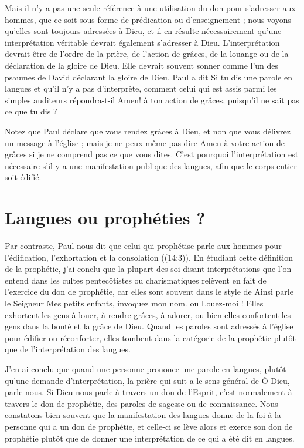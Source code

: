 Mais il n'y a pas une seule référence à une utilisation du don
 pour s'adresser aux hommes, que ce soit sous forme de prédication
 ou d'enseignement ; nous voyons qu'elles sont toujours adressées à Dieu,
 et il en résulte nécessairement qu'une interprétation véritable devrait
 également s'adresser à Dieu. L'interprétation devrait être de l'ordre
 de la prière, de l'action de grâces, de la louange ou de la déclaration
 de la gloire de Dieu. Elle devrait souvent sonner comme l'un des psaumes
 de David déclarant la gloire de Dieu. Paul a dit\frcolon{}
 \Og Si tu dis une parole en langues et qu'il n'y a pas d'interprète,
 comment celui qui est assis parmi les simples auditeurs
 répondra-t-il\frcolon{} Amen! à ton action de grâces, puisqu'il ne sait pas
 ce que tu dis ? \Fg{}

Notez que Paul déclare que vous rendez grâces à Dieu, et non que vous délivrez
 un message à l'église ; mais je ne peux même pas dire \Og Amen \Fg{}
 à votre action de grâces si je ne comprend pas ce que vous dites.
 C'est pourquoi l'interprétation est nécessaire s'il y a une manifestation
 publique des langues, afin que le corps entier soit édifié.


\section{Langues ou proph\'eties ?}

Par contraste, Paul nous dit que celui qui prophétise
 parle aux hommes pour l'édification, l'exhortation et la consolation
 ((14:3)). En étudiant cette définition
 de la prophétie, j'ai conclu que la plupart des soi-disant
 interprétations que l'on entend dans les cultes pentecôtistes
 ou charismatiques relèvent en fait de l'exercice du don de prophétie,
 car elles sont souvent dans le style de\frcolon{} \Og Ainsi parle le Seigneur\frcolon{}
 \Og Mes petits enfants, invoquez mon nom. \Fg{} ou \Og Louez-moi ! \Fg{}
 Elles exhortent les gens à louer, à rendre grâces, à adorer,
 ou bien elles confortent les gens dans la bonté et la grâce de Dieu.
 Quand les paroles sont adressés à l'église pour édifier ou réconforter, elles tombent
 dans la catégorie de la prophétie plutôt que de l'interprétation des langues.

J'en ai conclu que quand une personne prononce une parole en langues,
 plutôt qu'une demande d'interprétation, la prière qui suit
 a le sens général de\frcolon{} \Og Ô Dieu, parle-nous. \Fg{}
 Si Dieu nous parle à travers un don de l'Esprit, c'est normalement
 à travers le don de prophétie, des paroles de sagesse ou de connaissance.
 Nous constatons bien souvent que la manifestation des langues donne de la foi
 à la personne qui a un don de prophétie, et celle-ci se lève alors et exerce son don
 de prophétie plutôt que de donner une interprétation de ce qui a été dit
 en langues.


